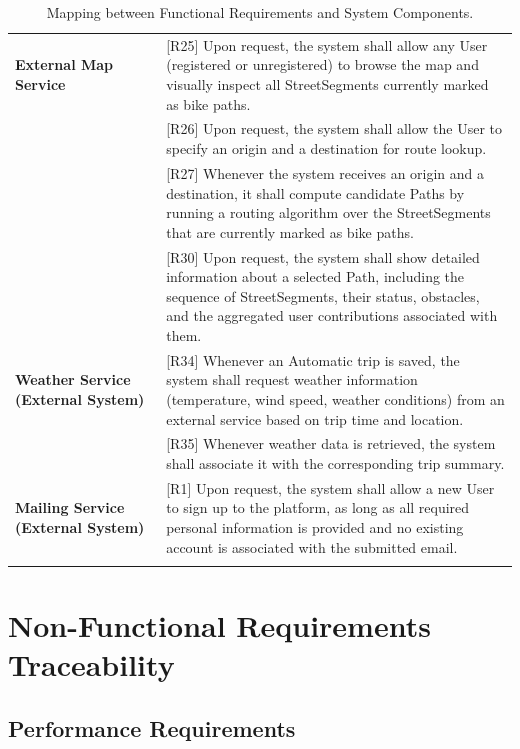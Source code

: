 \begin{center}
\begin{longtable}{p{0.30\linewidth}p{0.70\linewidth}}
\textbf{External Map Service} &
[R25] Upon request, the system shall allow any User (registered or unregistered) to browse the map and visually inspect all StreetSegments currently marked as bike paths. \\
& [R26] Upon request, the system shall allow the User to specify an origin and a destination for route lookup. \\
& [R27] Whenever the system receives an origin and a destination, it shall compute candidate Paths by running a routing algorithm over the StreetSegments that are currently marked as bike paths. \\
& [R30] Upon request, the system shall show detailed information about a selected Path, including the sequence of StreetSegments, their status, obstacles, and the aggregated user contributions associated with them. \\
\hline

\textbf{Weather Service (External System)} &
[R34] Whenever an Automatic trip is saved, the system shall request weather information (temperature, wind speed, weather conditions) from an external service based on trip time and location. \\
& [R35] Whenever weather data is retrieved, the system shall associate it with the corresponding trip summary. \\
\hline

\textbf{Mailing Service (External System)} &
[R1] Upon request, the system shall allow a new User to sign up to the platform, as long as all required personal information is provided and no existing account is associated with the submitted email. \\
\hline

\caption{Mapping between Functional Requirements and System Components.}
\label{tab:map_comp_req}
\end{longtable}
\end{center}

\newpage

\section{Non-Functional Requirements Traceability}
\label{sec:non_functional_requirements_traceability}

\subsection{Performance Requirements}
\label{subsec:performance_requirements}

